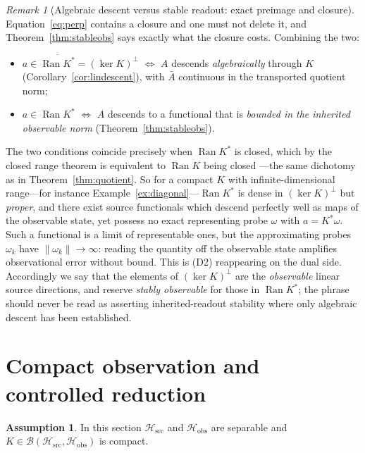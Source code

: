 \documentclass[11pt,reqno]{amsart}
\numberwithin{equation}{section}
\theoremstyle{plain}
\theoremstyle{definition}
\newtheorem{assumption}[theorem]{Assumption}
\theoremstyle{remark}
\newtheorem{remark}[theorem]{Remark}
\newcommand{\Hsrc}{\mathcal{H}_{\mathrm{src}}}
\newcommand{\Hobs}{\mathcal{H}_{\mathrm{obs}}}
\newcommand{\Ran}{\operatorname{Ran}}
\begin{document}
\begin{remark}[Algebraic descent versus stable readout: exact preimage and closure]
\label{rem:closure}
Equation~\eqref{eq:perp} contains a closure and one must not delete it, and
Theorem~\ref{thm:stableobs} says exactly what the closure costs. Combining the two:
\begin{itemize}
\item $a\in\overline{\Ran K^{*}}=(\ker K)^{\perp}$
$\iff$ $A$ descends \emph{algebraically} through $K$ (Corollary~\ref{cor:lindescent}), with
$\bar A$ continuous in the transported quotient norm;
\item $a\in\Ran K^{*}$
$\iff$ $A$ descends to a functional that is \emph{bounded in the inherited observable norm}
(Theorem~\ref{thm:stableobs}).
\end{itemize}
The two conditions coincide precisely when $\Ran K^{*}$ is closed, which by the closed range
theorem is equivalent to $\Ran K$ being closed \cite[Thm.~2.19]{Brezis}---the same dichotomy
as in Theorem~\ref{thm:quotient}. So for a compact $K$ with infinite-dimensional range---for
instance Example~\ref{ex:diagonal}---$\Ran K^{*}$ is dense in $(\ker K)^{\perp}$ but
\emph{proper}, and there exist source functionals which descend perfectly well as maps of the
observable state, yet possess no exact representing probe $\omega$ with $a=K^{*}\omega$. Such
a functional is a limit of representable ones, but the approximating probes
$\omega_{k}$ have $\lVert\omega_{k}\rVert\to\infty$: reading the quantity off the observable
state amplifies observational error without bound. This is (D2) reappearing on the dual side.
Accordingly we say that the elements of $(\ker K)^{\perp}$ are the \emph{observable} linear
source directions, and reserve \emph{stably observable} for those in $\Ran K^{*}$; the phrase
should never be read as asserting inherited-readout stability where only algebraic descent has
been established.
\end{remark}

\section{Compact observation and controlled reduction}
\label{sec:compact}

\begin{assumption}
\label{ass:compact}
In this section $\Hsrc$ and $\Hobs$ are separable and $K\in\mathcal{B}(\Hsrc,\Hobs)$ is
compact.
\end{assumption}
\end{document}
